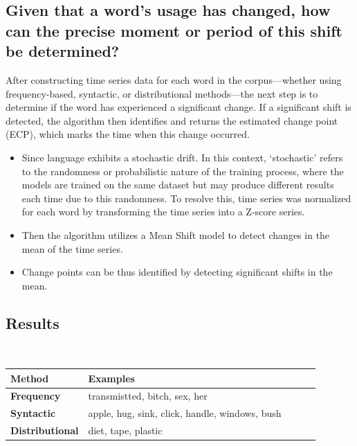 \subsection{Given that a word's usage has changed, how can the precise moment or period of this shift be determined?} \label{subsec:kulkarni-rq2}
After constructing time series data for each word in the corpus—whether using frequency-based, syntactic, or distributional methods—the next step is to determine if the word has experienced a significant change.
If a significant shift is detected, the algorithm then identifies and returns the estimated change point (ECP), which marks the time when this change occurred.
\begin{itemize}
    \item Since language exhibits a stochastic drift.
        In this context, `stochastic' refers to the randomness or probabilistic nature of the training process,
        where the models are trained on the same dataset but may produce different results each time due to this randomness.
        To resolve this, time series was normalized for each word by transforming the time series into a Z-score series.
    \item Then the algorithm utilizes a Mean Shift model to detect changes in the mean of the time series.
    \item Change points can be thus identified by detecting significant shifts in the mean.
\end{itemize}

\subsection{Results} \label{subsec:kulkarni-results}

 \\

\begin{table}[]
\begin{tabular}{@{}lllll@{}}
\toprule
\textbf{Method}         & \textbf{Examples}                              &  &  &  \\ \midrule
\textbf{Frequency}      & transmistted, bitch, sex, her                  &  &  &  \\
\textbf{Syntactic}      & apple, hug, sink, click, handle, windows, bush &  &  &  \\
\textbf{Distributional} & diet, tape, plastic                            &  &  &  \\ \bottomrule
\end{tabular}\label{tab:time-series-examples}
\end{table}

